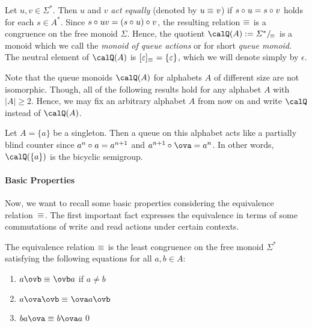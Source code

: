 \begin{definition}
	Let $u,v\in\varSigma^*$. Then $u$ and $v$ \emph{act equally} (denoted by ${u\equiv_{} v}$) if $s\circ_{} u=s\circ_{} v$ holds for each $s\in A^*$.
	Since $s\circ_{} uv=(s\circ_{} u)\circ_{} v$, the resulting relation $\equiv_{}$
	is a congruence on the free monoid $\varSigma$. Hence, the
	quotient $\Qx(A):=\partition{\varSigma^*}{\equivx}$ is a monoid
	which we call the \emph{monoid of queue actions} or for short \emph{queue monoid}. 
	The neutral element of $\Qx(A)$ is $[\varepsilon]_{\equiv_{}} = \{\varepsilon\}$, which we will denote simply by $\epsilon$.
\end{definition}

Note that the queue monoids $\Qx(A)$ for alphabets $A$ of different size are not isomorphic. Though, all of the following results hold for any alphabet $A$ with $|A|\geq2$. Hence, we may fix an arbitrary alphabet $A$ from now on and write $\Qx$ instead of $\Qx(A)$.

\begin{remark}
	Let $A=\{a\}$ be a singleton. Then a queue on this alphabet acts like a partially blind counter since $a^n\circ_{} a=a^{n+1}$ and $a^{n+1}\opx\ova=a^n$. In other words, $\Qx(\{a\})$ is the bicyclic semigroup.
\end{remark}

\paragraph*{Basic Properties}
Now, we want to recall some basic properties considering the equivalence relation~$\equiv_{}$. The first important fact expresses the equivalence in terms of some commutations of write and read actions under certain contexts.

\begin{theorem}\label{thm:equiv}
	The equivalence relation $\equiv_{}$ is the least congruence on the free monoid $\varSigma^*$ satisfying the following equations for all $a,b\in A$:
	\begin{enumerate}[(1)]
		\item $a\ovb\equivx\ovb a$ if $a\neq b$\label{thm:equiv:i1}
		\item $a\ova\ovb\equivx\ova a\ovb$\label{thm:equiv:i2}
		\item $ba\ova\equivx b\ova a$\label{thm:equiv:i3}\qed
	\end{enumerate}
\end{theorem}

